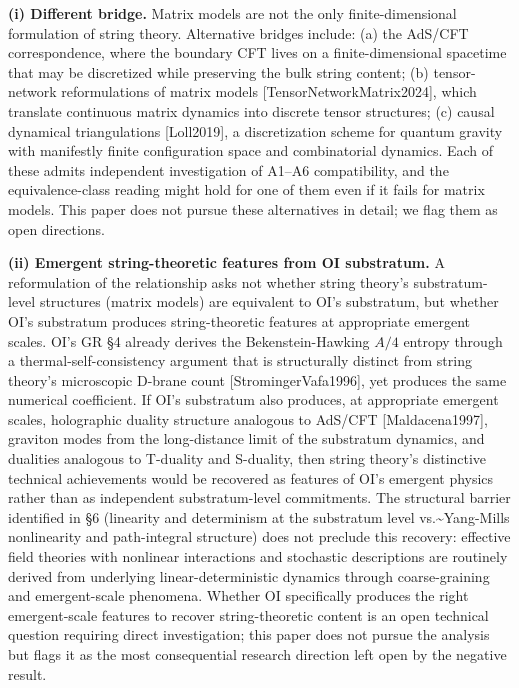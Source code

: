 \documentclass[
]{article}
\begin{document}
\textbf{(i) Different bridge.} Matrix models are not the only
finite-dimensional formulation of string theory. Alternative bridges
include: (a) the AdS/CFT correspondence, where the boundary CFT lives on
a finite-dimensional spacetime that may be discretized while preserving
the bulk string content; (b) tensor-network reformulations of matrix
models {[}TensorNetworkMatrix2024{]}, which translate continuous matrix
dynamics into discrete tensor structures; (c) causal dynamical
triangulations {[}Loll2019{]}, a discretization scheme for quantum
gravity with manifestly finite configuration space and combinatorial
dynamics. Each of these admits independent investigation of A1--A6
compatibility, and the equivalence-class reading might hold for one of
them even if it fails for matrix models. This paper does not pursue
these alternatives in detail; we flag them as open directions.

\textbf{(ii) Emergent string-theoretic features from OI substratum.} A
reformulation of the relationship asks not whether string theory's
substratum-level structures (matrix models) are equivalent to OI's
substratum, but whether OI's substratum produces string-theoretic
features at appropriate emergent scales. OI's GR §4 already derives the
Bekenstein-Hawking \(A/4\) entropy through a thermal-self-consistency
argument that is structurally distinct from string theory's microscopic
D-brane count {[}StromingerVafa1996{]}, yet produces the same numerical
coefficient. If OI's substratum also produces, at appropriate emergent
scales, holographic duality structure analogous to AdS/CFT
{[}Maldacena1997{]}, graviton modes from the long-distance limit of the
substratum dynamics, and dualities analogous to T-duality and S-duality,
then string theory's distinctive technical achievements would be
recovered as features of OI's emergent physics rather than as
independent substratum-level commitments. The structural barrier
identified in §6 (linearity and determinism at the substratum level
vs.\textasciitilde Yang-Mills nonlinearity and path-integral structure)
does not preclude this recovery: effective field theories with nonlinear
interactions and stochastic descriptions are routinely derived from
underlying linear-deterministic dynamics through coarse-graining and
emergent-scale phenomena. Whether OI specifically produces the right
emergent-scale features to recover string-theoretic content is an open
technical question requiring direct investigation; this paper does not
pursue the analysis but flags it as the most consequential research
direction left open by the negative result.
\end{document}
